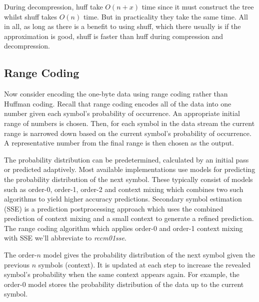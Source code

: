 During decompression, huff take $O(n + x)$ time since it must construct the tree
whilst shuff takes $O(n)$ time. But in practicality they take the same time. All
in all, as long as there is a benefit to using shuff, which there usually is if
the approximation is good, shuff is faster than huff during compression and
decompression.



\subsection{Range Coding}

Now consider encoding the one-byte data using range coding rather than Huffman
coding. Recall that range coding encodes all of the data into one number given
each symbol's probability of occurrence.  An appropriate initial range of
numbers is chosen. Then, for each symbol in the data stream the current range is
narrowed down based on the current symbol's probability of occurrence. A
representative number from the final range is then chosen as the output.

The probability distribution can be predetermined, calculated by an initial pass
or predicted adaptively. Most available implementations use models
for predicting the probability distribution of the next symbol. These typically
consist of models such as order-0, order-1, order-2 and context mixing which combines
two such algorithms to yield higher accuracy predictions. Secondary symbol
estimation (SSE) is a prediction postprocessing approach which uses the combined
prediction of context mixing and a small context to generate a refined
prediction. The range coding algorithm which applies order-0 and order-1 context
mixing with SSE we'll abbreviate to \textit{rccm01sse}.

The order-$n$ model gives the probability distribution of the next symbol given
the previous $n$ symbols (context). It is updated at each step to increase the
revealed symbol's probability when the same context appears again. For example,
the order-0 model stores the probability distribution of the data up to the
current symbol.

